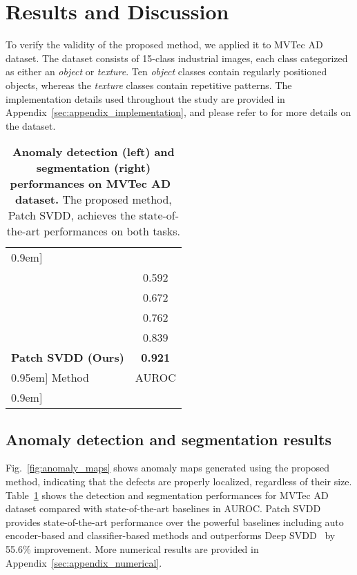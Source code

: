 \documentclass[runningheads]{llncs}
\begin{document}
\section{Results and Discussion}
To verify the validity of the proposed method, we applied it to MVTec AD~\cite{mvtecad} dataset.
The dataset consists of 15-class industrial images, each class categorized as either an \textit{object} or \textit{texture}.
Ten \textit{object} classes contain regularly positioned objects, whereas the \textit{texture} classes contain repetitive patterns.
The implementation details used throughout the study are provided in Appendix~\ref{sec:appendix_implementation}, and please refer to \cite{mvtecad} for more details on the dataset.


\begin{table}[t]
  \centering
  \caption{\textbf{Anomaly detection (left) and segmentation (right) performances on MVTec AD~\cite{mvtecad} dataset.} The proposed method, Patch SVDD, achieves the state-of-the-art performances on both tasks.}
  \vspace{0.5em}
  \begin{minipage}{0.5\linewidth}
   \centering
   \begin{tabular}{l @{\hskip 0.07in}c}
    \Xhline{1pt}\-0.9em]
    \multicolumn{2}{l}{Task: Anomaly Detection}                     \\
      & 0.592 \\
            & 0.672\\
       & 0.762\\
              & 0.839 \\
    \textbf{Patch SVDD (Ours)}                              & \textbf{0.921} \\
    \-0.95em]
     Method     & AUROC\\
    \hline\hline
    \-0.9em]
    \Xhline{1pt}
    \end{tabular}\end{minipage}\hfill
  \vspace{-1em}
  \label{table:anomaly_det_seg}
\end{table}
 
\subsection{Anomaly detection and segmentation results}
Fig.~\ref{fig:anomaly_maps} shows anomaly maps generated using the proposed method, indicating that the defects are properly localized, regardless of their size.
Table~\ref{table:anomaly_det_seg} shows the detection and segmentation performances for MVTec AD~\cite{mvtecad} dataset compared with state-of-the-art baselines in AUROC.
Patch SVDD provides state-of-the-art performance over the powerful baselines including auto encoder-based and classifier-based methods and outperforms Deep SVDD~\cite{deepSVDD} by 55.6\% improvement.
More numerical results are provided in Appendix~\ref{sec:appendix_numerical}.
\end{document}
